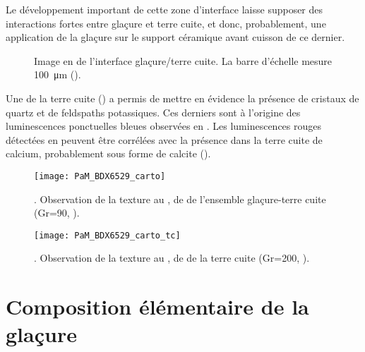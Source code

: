 Le développement important de cette zone d'interface laisse supposer 
des interactions fortes entre glaçure et terre cuite, et donc, 
probablement, une application de la glaçure sur le support céramique 
avant cuisson de ce dernier.

\begin{figure}[htb]
  \caption[\ -- Observation de la texture au \MEB, 
           en mode \ERD. Interface glaçure/terre cuite]
          {\legendeB
           Image en \ERD de l'interface glaçure/terre cuite. 
           La barre d'échelle mesure \SI{100}{\um} ().}
  \label{MEB:6529_img_int}
\end{figure}

Une \carto de la terre cuite () a permis de 
mettre en évidence la présence de cristaux de quartz et de feldspaths 
potassiques. Ces derniers sont à l'origine des luminescences 
ponctuelles bleues observées en \CL. Les luminescences rouges 
détectées en \CL peuvent être corrélées avec la présence dans la terre 
cuite de calcium, probablement sous forme de calcite (\calcite).

\begin{figure}[htb]
  \texttt{[image: PaM\_BDX6529\_carto]}%
  \caption[\ -- Observation de la texture au \MEB, \carto 
           de \RX de l'ensemble glaçure-terre cuite]
          {\legendeB.
           Observation de la texture au \MEB, \carto de \RX de 
           l'ensemble glaçure-terre cuite (Gr=90, ).}
  \label{MEB:6529_carto_tcgla}
\end{figure}

\begin{figure}[htb]
  \texttt{[image: PaM\_BDX6529\_carto\_tc]}%
  \caption[\ -- Observation de la texture au \MEB, \carto 
           de \RX de la terre cuite]
          {\legendeB.
           Observation de la texture au \MEB, \carto de \RX de la 
           terre cuite (Gr=200, ).}
  \label{MEB:6529_carto_tc}
\end{figure}


\section{Composition élémentaire de la glaçure}

